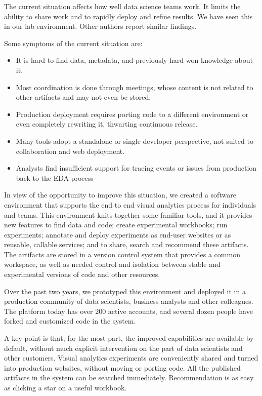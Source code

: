 The current situation affects how well data science teams work. It limits
the ability to share work and to rapidly deploy and refine results.
We have seen this in our lab environment.
Other authors report similar findings.

Some symptoms of the current situation are:
\begin{itemize}
\item It is hard to find data, metadata, and previously hard-won knowledge about it.
\item Most coordination is done through meetings, whose content is not related to other artifacts and may not even be stored.
\item Production deployment requires porting code to a different environment or even completely rewriting it, thwarting continuous release.
\item Many tools adopt a standalone or single developer perspective,
not suited to collaboration and web deployment. 
\item Analysts find insufficient support for tracing events or issues from production back to the EDA process
\end{itemize}

In view of the opportunity to improve this situation,
we created a software environment that supports the end to end
visual analytics process for individuals and teams.
This environment knits together some familiar tools, and it
provides new features to find data and code; create experimental workbooks;
run experiments; annotate and deploy experiments as end-user websites or
as reusable, callable services; and to share, search and recommend these artifacts. The artifacts are stored in a version
control system that provides a common workspace, as well as needed control
and isolation between stable and experimental versions of code and other
resources. 

Over the past two years, we prototyped this environment and deployed it
in a production community of data scientists, business analysts and other colleagues.
The platform today has over 200 active accounts, and several dozen people have forked
and customized code in the system.

A key point is that, for the most part, the improved capabilities are
available by default, without much explicit intervention on the part of
data scientists and other customers. Visual analytics experiments are
conveniently shared and turned into production websites, without moving
or porting code. All the published artifacts in the system can be
searched immediately. Recommendation is as easy as clicking a star
on a useful workbook.

